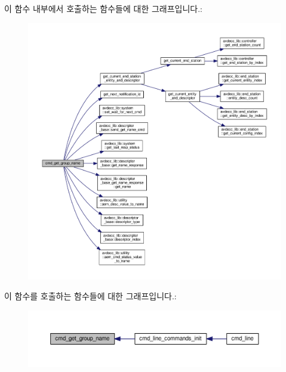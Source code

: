 이 함수 내부에서 호출하는 함수들에 대한 그래프입니다.\+:
\nopagebreak
\begin{figure}[H]
\begin{center}
\leavevmode
\includegraphics[width=350pt]{classcmd__line_a56481509c218ebbd521cd60a0aab31fb_cgraph}
\end{center}
\end{figure}




이 함수를 호출하는 함수들에 대한 그래프입니다.\+:
\nopagebreak
\begin{figure}[H]
\begin{center}
\leavevmode
\includegraphics[width=350pt]{classcmd__line_a56481509c218ebbd521cd60a0aab31fb_icgraph}
\end{center}
\end{figure}


